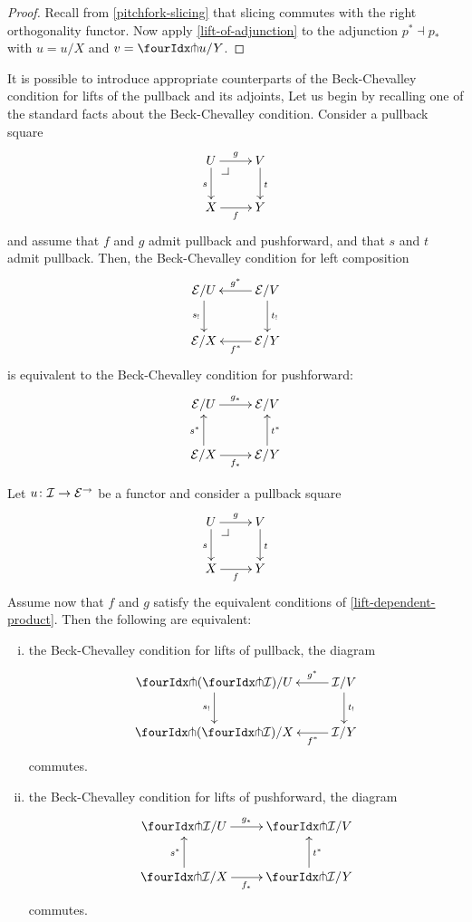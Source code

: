 \documentclass[reqno,10pt,a4paper,oneside]{amsart}
\begin{document}
\begin{proof}
Recall from \cref{pitchfork-slicing} that slicing commutes with the right orthogonality functor.
Now apply \cref{lift-of-adjunction} to the adjunction $p^* \dashv p_*$ with $u = u/X$ and $v = \liftr{u}/Y$.
\end{proof}

It is possible to introduce appropriate counterparts of the Beck-Chevalley condition for lifts of the pullback and its adjoints, 
Let us begin by recalling one of the standard facts about the Beck-Chevalley condition. Consider a
pullback square 
\[
\xymatrix{
  U
  \ar[d]_{s}
  \ar[r]^{g}
  \pullback{dr}
&
  V
  \ar[d]^{t}
\\
  X
  \ar[r]_{f}
&
  Y
}
\]
and assume that $f$ and $g$ admit pullback and pushforward, and that $s$ and $t$ admit pullback. Then,
 the Beck-Chevalley condition for left composition
\[
\xymatrix{
  \catE/U
  \ar[d]_{s_!}
&
  \catE/V
  \ar[l]_{g^*}
  \ar[d]^{t_!}
\\
  \catE/X
&
  \catE/Y
  \ar[l]^{f^*}
}
\]
is equivalent to the Beck-Chevalley condition for pushforward:
\[
\xymatrix{
  \catE/U
  \ar[r]^{g_*}
&
  \catE/V
\\
  \catE/X
  \ar[r]_{f_*}
  \ar[u]^{s^*}
&
  \catE/Y
  \ar[u]_{t^*}
}
\]





\begin{proposition}
\label{lift-pushforward-BC} Let $u \colon \mathcal{I} \to \mathcal{E}^{\to}$ be a functor and consider a 
pullback square
\[
\xymatrix{
  U
  \ar[d]_{s}
  \ar[r]^{g}
  \pullback{dr}
&
  V
  \ar[d]^{t}
\\
  X
  \ar[r]_{f}
&
  Y
}
\]
Assume now that $f$ and $g$ satisfy the equivalent conditions of \cref{lift-dependent-product}.
Then the following are equivalent:
\begin{enumerate}[(i)]
\item the Beck-Chevalley condition for lifts of pullback, \ie the diagram
\[
\xymatrix{
  \liftl{(\liftr{\cal{I}})}/U
  \ar[d]_{s_!}
&
  \cal{I}/V
  \ar[l]_-{g^*}
  \ar[d]^{t_!}
\\
  \liftl{(\liftr{\cal{I}})}/X
&
  \cal{I}/Y
  \ar[l]^-{f^*}
}
\]
commutes. 
\item the Beck-Chevalley  condition for lifts of pushforward, \ie the diagram
\[
\xymatrix{
  \liftr{\cal{I}}/U
  \ar[r]^{g_*}
&
  \liftr{\cal{I}}/V
\\
  \liftr{\cal{I}}/X
  \ar[r]_{f_*}
  \ar[u]^{s^*}
&
  \liftr{\cal{I}}/Y
  \ar[u]_{t^*}
}
\]
commutes.
\end{enumerate}
\end{proposition}
\end{document}
